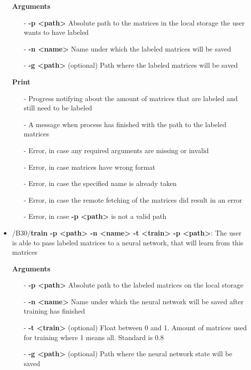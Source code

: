 \documentclass[parskip=full]{scrartcl}
\begin{document}
\begin{itemize}
\textbf{Arguments}
	\begin{itemize}
	\item[-]\textbf{-p <path>} Absolute path to the matrices in the local storage the user wants to have labeled
	\item[-]\textbf{-n <name>} Name under which the labeled matrices will be saved
	\item[-]\textbf{-g <path>} (optional) Path where the labeled matrices will be saved
	\end{itemize}

\textbf{Print}
	\begin{itemize}
	\item[-]Progress notifying about the amount of matrices that are labeled and still need to be labeled
	\item[-]A message when process has finished with the path to the labeled matrices
	\item[-]Error, in case any required arguments are missing or invalid
	\item[-]Error, in case matrices have wrong format
	\item[-]Error, in case the specified name is already taken
	\item[-]Error, in case the remote fetching of the matrices did result in an error
	\item[-]Error, in case \textbf{-p <path>} is not a valid path
	\end{itemize}

\item/B30/\textbf{train -p <path> -n <name> -t <train> -p <path>}:
\newline The user is able to pass labeled matrices to a neural network, that will learn from this matrices

\textbf{Arguments}
	\begin{itemize}
	\item[-]\textbf{-p <path>} Absolute path to the labeled matrices on the local storage
	\item[-]\textbf{-n <name>} Name under which the neural network will be saved after training has finished
	\item[-]\textbf{-t <train>} (optional) Float between 0 and 1. Amount of matrices used for training where 1 means all. Standard is 0.8
	\item[-]\textbf{-g <path>} (optional) Path where the neural network state will be saved
	\end{itemize}


\end{itemize}
\end{document}
